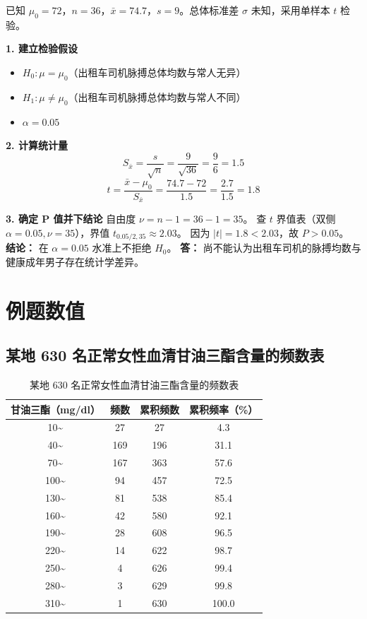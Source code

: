 \documentclass[lang=cn,10pt]{elegantbook}
\begin{document}
\begin{solution}
    已知 $\mu_0 = 72$，$n = 36$，$\bar{x} = 74.7$，$s = 9$。总体标准差 $\sigma$ 未知，采用单样本 $t$ 检验。

    \textbf{1. 建立检验假设}
    \begin{itemize}
        \item $H_0: \mu = \mu_0$（出租车司机脉搏总体均数与常人无异）
        \item $H_1: \mu \neq \mu_0$（出租车司机脉搏总体均数与常人不同）
        \item $\alpha = 0.05$
    \end{itemize}

    \textbf{2. 计算统计量}
    \[
        S_{\bar{x}} = \frac{s}{\sqrt{n}} = \frac{9}{\sqrt{36}} = \frac{9}{6} = 1.5
    \]
    \[
        t = \frac{\bar{x} - \mu_0}{S_{\bar{x}}} = \frac{74.7 - 72}{1.5} = \frac{2.7}{1.5} = 1.8
    \]

    \textbf{3. 确定 P 值并下结论}
    自由度 $\nu = n - 1 = 36 - 1 = 35$。
    查 $t$ 界值表（双侧 $\alpha=0.05, \nu=35$），界值 $t_{0.05/2, 35} \approx 2.03$。
    因为 $|t| = 1.8 < 2.03$，故 $P > 0.05$。
    \textbf{结论：} 在 $\alpha=0.05$ 水准上不拒绝 $H_0$。
    \textbf{答：} 尚不能认为出租车司机的脉搏均数与健康成年男子存在统计学差异。
\end{solution}

\chapter{例题数值}
\section{某地 630 名正常女性血清甘油三酯含量的频数表}
\begin{table}[htbp]
  \centering
  \caption{某地 630 名正常女性血清甘油三酯含量的频数表}
  \label{tab:tg-630}
  \begin{tabular}{cccc}
    \hline
    甘油三酯（mg/dl） & 频数 & 累积频数 & 累积频率（\%） \\
    \hline
    10\textasciitilde  & 27  & 27  & 4.3   \\
    40\textasciitilde  & 169 & 196 & 31.1  \\
    70\textasciitilde  & 167 & 363 & 57.6  \\
    100\textasciitilde & 94  & 457 & 72.5  \\
    130\textasciitilde & 81  & 538 & 85.4  \\
    160\textasciitilde & 42  & 580 & 92.1  \\
    190\textasciitilde & 28  & 608 & 96.5  \\
    220\textasciitilde & 14  & 622 & 98.7  \\
    250\textasciitilde & 4   & 626 & 99.4  \\
    280\textasciitilde & 3   & 629 & 99.8  \\
    310\textasciitilde & 1   & 630 & 100.0 \\
    \hline
  \end{tabular}
\end{table}
\end{document}
